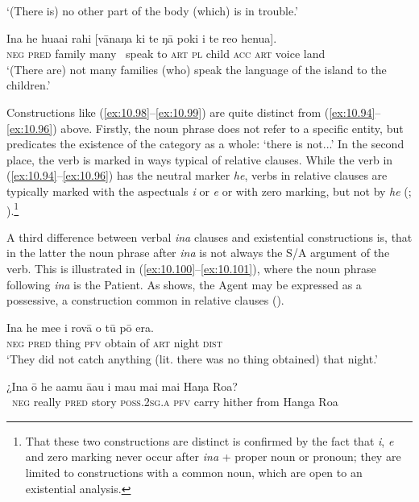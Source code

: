 \glt 
‘(There is) no other part of the body (which) is in trouble.’ \textstyleExampleref{[R481.091]} 
\z

\ea\label{ex:10.99}
\gll {\ꞌ}Ina he hua{\ꞌ}ai rahi [vānaŋa ki te ŋā poki i te re{\ꞌ}o henua].\\
\textsc{neg} \textsc{pred} family many ~speak to \textsc{art} \textsc{pl} child \textsc{acc} \textsc{art} voice land\\

\glt
‘(There are) not many families (who) speak the language of the island to the children.’ \textstyleExampleref{[R533.006]} 
\z

Constructions like (\ref{ex:10.98}–\ref{ex:10.99}) are quite distinct from (\ref{ex:10.94}–\ref{ex:10.96}) above. Firstly, the noun phrase does not refer to a specific entity, but predicates the existence of the category as a whole: ‘there is not...’ In the second place, the verb is marked in ways typical of relative clauses. While the verb in (\ref{ex:10.94}–\ref{ex:10.96}) has the neutral marker \textit{he}, verbs in relative clauses are typically marked with the aspectuals \textit{i} or \textit{e} or with zero marking, but not by \textit{he} (; ).\footnote{\label{fn:492}That these two constructions are distinct is confirmed by the fact that \textit{i}, \textit{e} and zero marking never occur after \textit{{\ꞌ}ina} + proper noun or pronoun; they are limited to constructions with a common noun, which are open to an existential analysis.}

A third difference between verbal \textit{{\ꞌ}ina} clauses and existential constructions is, that in the latter the noun phrase after \textit{{\ꞌ}ina} is not always the S/A argument of the verb. This is illustrated in (\ref{ex:10.100}–\ref{ex:10.101}), where the noun phrase following \textit{{\ꞌ}ina} is the Patient. As  shows, the Agent may be expressed as a possessive, a construction common in relative clauses ().

\ea\label{ex:10.100}
\gll {\ꞌ}Ina he me{\ꞌ}e i rovā o tū pō era. \\
\textsc{neg} \textsc{pred} thing \textsc{pfv} obtain of \textsc{art} night \textsc{dist} \\

\glt 
‘They did not catch anything (lit. there was no thing obtained) that night.’ \textstyleExampleref{[R359.005]} 
\z

\ea\label{ex:10.101}
\gll ¿{\ꞌ}Ina {\ꞌ}ō he {\ꞌ}a{\ꞌ}amu {\ꞌ}ā{\ꞌ}au i ma{\ꞌ}u mai mai Haŋa Roa?\\
~\textsc{neg} really \textsc{pred} story \textsc{poss.2sg.a} \textsc{pfv} carry hither from Hanga Roa\\

